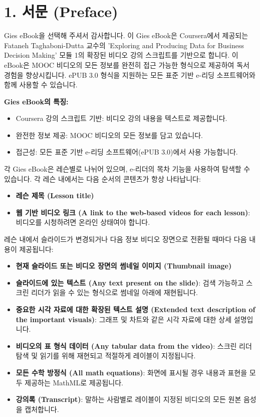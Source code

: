 \documentclass[11pt,a4paper]{article}
\theoremstyle{definition}
\begin{document}
\newpage
\section{1. 서문 (Preface)}

Gies eBook을 선택해 주셔서 감사합니다. 이 Gies eBook은 Coursera에서 제공되는 Fataneh Taghaboni-Dutta 교수의 'Exploring and Producing Data for Business Decision Making' 모듈 1의 확장된 비디오 강의 스크립트를 기반으로 합니다. 이 eBook은 MOOC 비디오의 모든 정보를 완전히 접근 가능한 형식으로 제공하여 독서 경험을 향상시킵니다. ePUB 3.0 형식을 지원하는 모든 표준 기반 e-리딩 소프트웨어와 함께 사용할 수 있습니다.

\begin{summarybox}
\textbf{Gies eBook의 특징:}
\begin{itemize}
    \item Coursera 강의 스크립트 기반: 비디오 강의 내용을 텍스트로 제공합니다.
    \item 완전한 정보 제공: MOOC 비디오의 모든 정보를 담고 있습니다.
    \item 접근성: 모든 표준 기반 e-리딩 소프트웨어(ePUB 3.0)에서 사용 가능합니다.
\end{itemize}
\end{summarybox}

각 Gies eBook은 레슨별로 나뉘어 있으며, e-리더의 목차 기능을 사용하여 탐색할 수 있습니다. 각 레슨 내에서는 다음 순서의 콘텐츠가 항상 나타납니다:

\begin{itemize}
    \item \textbf{레슨 제목 (Lesson title)}
    \item \textbf{웹 기반 비디오 링크 (A link to the web-based videos for each lesson)}: 비디오를 시청하려면 온라인 상태여야 합니다.
\end{itemize}

레슨 내에서 슬라이드가 변경되거나 다음 정보 비디오 장면으로 전환될 때마다 다음 내용이 제공됩니다:

\begin{itemize}
    \item \textbf{현재 슬라이드 또는 비디오 장면의 썸네일 이미지 (Thumbnail image)}
    \item \textbf{슬라이드에 있는 텍스트 (Any text present on the slide)}: 검색 가능하고 스크린 리더가 읽을 수 있는 형식으로 썸네일 아래에 재현됩니다.
    \item \textbf{중요한 시각 자료에 대한 확장된 텍스트 설명 (Extended text description of the important visuals)}: 그래프 및 차트와 같은 시각 자료에 대한 상세 설명입니다.
    \item \textbf{비디오의 표 형식 데이터 (Any tabular data from the video)}: 스크린 리더 탐색 및 읽기를 위해 재현되고 적절하게 레이블이 지정됩니다.
    \item \textbf{모든 수학 방정식 (All math equations)}: 화면에 표시될 경우 내용과 표현을 모두 제공하는 MathML로 제공됩니다.
    \item \textbf{강의록 (Transcript)}: 말하는 사람별로 레이블이 지정된 비디오의 모든 원본 음성을 캡처합니다.
\end{itemize}
\end{document}
